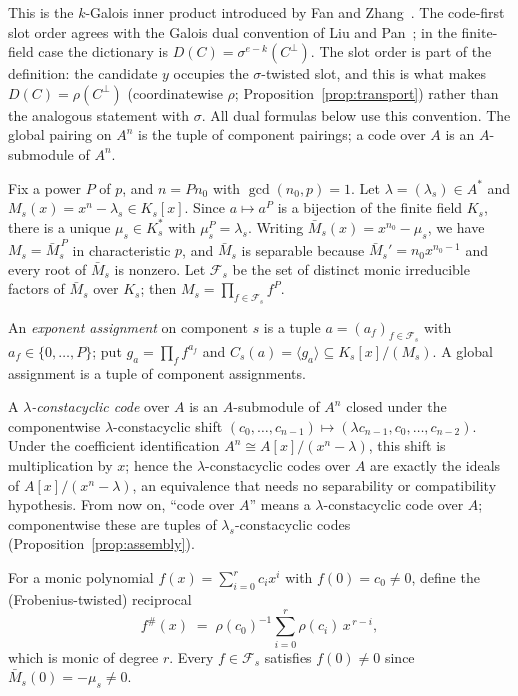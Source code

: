 \documentclass[11pt]{article}
\theoremstyle{definition}
\theoremstyle{remark}
\begin{document}
This is the \(k\)-Galois inner product introduced by Fan and
Zhang~\cite{FZ2017}. The code-first slot order agrees with the Galois
dual convention of Liu and Pan~\cite{LP2020}; in the finite-field case
the dictionary is \(D(C) = \sigma^{e-k}(C^\perp)\). The slot order is part of the definition: the candidate \(y\) occupies
the \(\sigma\)-twisted slot, and this is what makes
\(D(C) = \rho(C^\perp)\) (coordinatewise \(\rho\);
Proposition~\ref{prop:transport}) rather than the analogous statement
with \(\sigma\). All dual formulas below use this convention. The global
pairing on \(A^n\) is the tuple of component pairings; a code over \(A\)
is an \(A\)-submodule of \(A^n\).

Fix a power \(P\) of \(p\), and \(n = P n_0\) with
\(\gcd(n_0, p) = 1\). Let \(\lambda = (\lambda_s) \in A^*\) and
\(M_s(x) = x^n - \lambda_s \in K_s[x]\). Since \(a \mapsto a^P\) is a
bijection of the finite field \(K_s\), there is a unique \(\mu_s \in K_s^*\)
with \(\mu_s^P = \lambda_s\). Writing \(\bar M_s(x) = x^{n_0} - \mu_s\), we
have \(M_s = \bar M_s^{\,P}\) in characteristic \(p\), and \(\bar M_s\) is
separable because \(\bar M_s' = n_0 x^{n_0-1}\) and every root of
\(\bar M_s\) is nonzero. Let \(\mathcal{F}_s\) be the set of distinct
monic irreducible factors of \(\bar M_s\) over \(K_s\); then
\(M_s = \prod_{f \in \mathcal{F}_s} f^P\).

An \emph{exponent assignment} on component \(s\) is a tuple
\(a = (a_f)_{f \in \mathcal{F}_s}\) with \(a_f \in \{0, \dots, P\}\); put
\(g_a = \prod_f f^{a_f}\) and \(C_s(a) = \langle g_a \rangle \subseteq
K_s[x]/(M_s)\). A global assignment is a tuple of component assignments.

A \emph{\(\lambda\)-constacyclic code} over \(A\) is an \(A\)-submodule of
\(A^n\) closed under the componentwise \(\lambda\)-constacyclic shift
\((c_0,\dots,c_{n-1}) \mapsto (\lambda c_{n-1}, c_0, \dots, c_{n-2})\).
Under the coefficient identification \(A^n \cong A[x]/(x^n-\lambda)\), this
shift is multiplication by \(x\); hence the \(\lambda\)-constacyclic codes
over \(A\) are exactly the ideals of \(A[x]/(x^n-\lambda)\), an equivalence
that needs no separability or compatibility hypothesis. From now on,
``code over \(A\)'' means a \(\lambda\)-constacyclic code over \(A\);
componentwise these are tuples of \(\lambda_s\)-constacyclic codes
(Proposition~\ref{prop:assembly}).

For a monic polynomial \(f(x) = \sum_{i=0}^{r} c_i x^i\) with
\(f(0) = c_0 \ne 0\), define the (Frobenius-twisted) reciprocal
\[
f^{\#}(x) \;=\; \rho(c_0)^{-1} \sum_{i=0}^{r} \rho(c_i)\, x^{\,r-i},
\]
which is monic of degree \(r\). Every \(f \in \mathcal{F}_s\) satisfies
\(f(0) \ne 0\) since \(\bar M_s(0) = -\mu_s \ne 0\).
\end{document}
